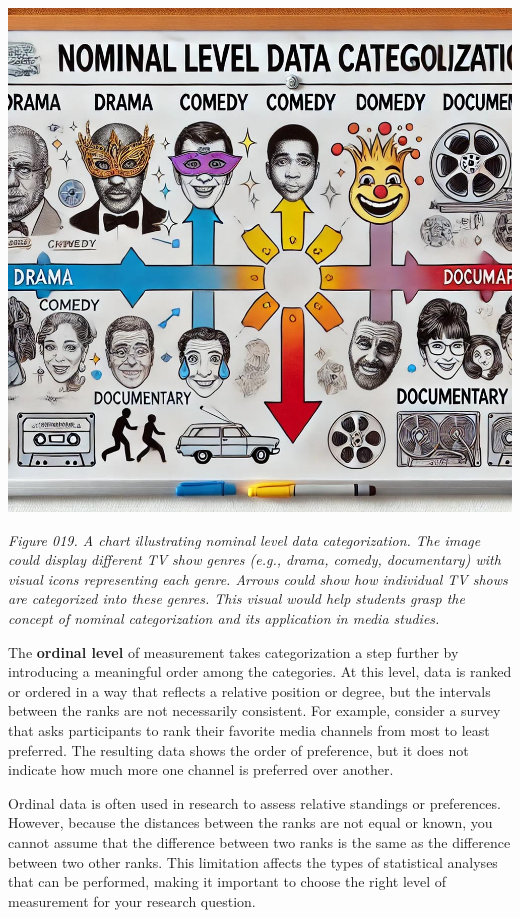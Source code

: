 \documentclass[
]{book}
\begin{document}
\includegraphics[width=1\linewidth,height=\textheight,keepaspectratio]{images/fig019.jpg}

\emph{Figure 019. A chart illustrating nominal level data categorization. The image could display different TV show genres (e.g., drama, comedy, documentary) with visual icons representing each genre. Arrows could show how individual TV shows are categorized into these genres. This visual would help students grasp the concept of nominal categorization and its application in media studies.}

The \textbf{ordinal level} of measurement takes categorization a step further by introducing a meaningful order among the categories. At this level, data is ranked or ordered in a way that reflects a relative position or degree, but the intervals between the ranks are not necessarily consistent. For example, consider a survey that asks participants to rank their favorite media channels from most to least preferred. The resulting data shows the order of preference, but it does not indicate how much more one channel is preferred over another.

Ordinal data is often used in research to assess relative standings or preferences. However, because the distances between the ranks are not equal or known, you cannot assume that the difference between two ranks is the same as the difference between two other ranks. This limitation affects the types of statistical analyses that can be performed, making it important to choose the right level of measurement for your research question.
\end{document}

